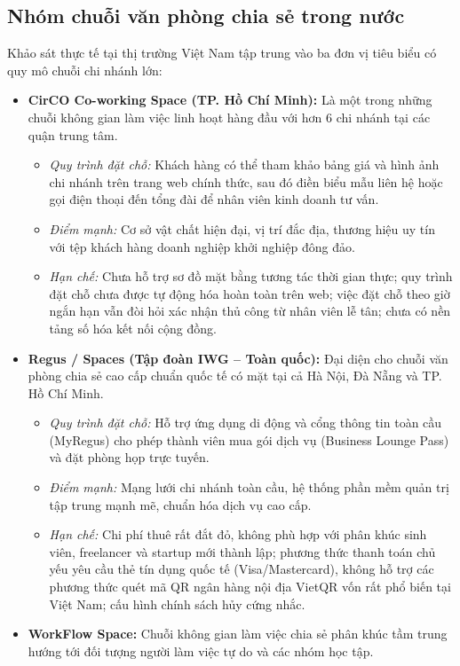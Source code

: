 \subsection{Nhóm chuỗi văn phòng chia sẻ trong nước}
Khảo sát thực tế tại thị trường Việt Nam tập trung vào ba đơn vị tiêu biểu có quy mô chuỗi chi nhánh lớn:
\begin{itemize}
    \item \textbf{CirCO Co-working Space (TP. Hồ Chí Minh):} Là một trong những chuỗi không gian làm việc linh hoạt hàng đầu với hơn 6 chi nhánh tại các quận trung tâm. 
    \begin{itemize}
        \item \textit{Quy trình đặt chỗ:} Khách hàng có thể tham khảo bảng giá và hình ảnh chi nhánh trên trang web chính thức, sau đó điền biểu mẫu liên hệ hoặc gọi điện thoại đến tổng đài để nhân viên kinh doanh tư vấn.
        \item \textit{Điểm mạnh:} Cơ sở vật chất hiện đại, vị trí đắc địa, thương hiệu uy tín với tệp khách hàng doanh nghiệp khởi nghiệp đông đảo.
        \item \textit{Hạn chế:} Chưa hỗ trợ sơ đồ mặt bằng tương tác thời gian thực; quy trình đặt chỗ chưa được tự động hóa hoàn toàn trên web; việc đặt chỗ theo giờ ngắn hạn vẫn đòi hỏi xác nhận thủ công từ nhân viên lễ tân; chưa có nền tảng số hóa kết nối cộng đồng.
    \end{itemize}
    \item \textbf{Regus / Spaces (Tập đoàn IWG -- Toàn quốc):} Đại diện cho chuỗi văn phòng chia sẻ cao cấp chuẩn quốc tế có mặt tại cả Hà Nội, Đà Nẵng và TP. Hồ Chí Minh.
    \begin{itemize}
        \item \textit{Quy trình đặt chỗ:} Hỗ trợ ứng dụng di động và cổng thông tin toàn cầu (MyRegus) cho phép thành viên mua gói dịch vụ (Business Lounge Pass) và đặt phòng họp trực tuyến.
        \item \textit{Điểm mạnh:} Mạng lưới chi nhánh toàn cầu, hệ thống phần mềm quản trị tập trung mạnh mẽ, chuẩn hóa dịch vụ cao cấp.
        \item \textit{Hạn chế:} Chi phí thuê rất đắt đỏ, không phù hợp với phân khúc sinh viên, freelancer và startup mới thành lập; phương thức thanh toán chủ yếu yêu cầu thẻ tín dụng quốc tế (Visa/Mastercard), không hỗ trợ các phương thức quét mã QR ngân hàng nội địa VietQR vốn rất phổ biến tại Việt Nam; cấu hình chính sách hủy cứng nhắc.
    \end{itemize}
    \item \textbf{WorkFlow Space:} Chuỗi không gian làm việc chia sẻ phân khúc tầm trung hướng tới đối tượng người làm việc tự do và các nhóm học tập.

\end{itemize}
